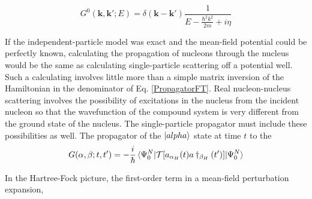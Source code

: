 \begin{equation} \label{PropagatorKSpace}
    G^{0}(\bm{k}, \bm{k'}; E) = \delta(\bm{k}-\bm{k'})\frac{1}{E-\frac{\hbar^{2}k^{2}}{2m} + i\eta}
\end{equation}

\noindent
If the independent-particle model was exact and the mean-field potential could be perfectly known,
calculating the propagation of nucleons through the nucleus would be the same as calculating
single-particle scattering off a potential well. Such a calculating involves little more than
a simple matrix inversion of the Hamiltonian in the denominator of Eq. \ref{PropagatorFT}.
Real nucleon-nucleus scattering involves the possibility of excitations in the nucleus from the incident
nucleon so that the wavefunction of the compound system is very different from the ground state of
the nucleus. The single-particle propagator must include these possibilities as well.
The propagator of the $\ket{alpha}$ state at time $t$ to the 
\begin{equation}
    G(\alpha, \beta; t, t') =
    -\frac{i}{\hbar}\braket{\Psi^{N}_{0}|\mathcal{T}[a_{\alpha_{H}}(t)a\dagger_{\beta_{H}}(t')]|\Psi^{N}_{0}}
\end{equation}

\noindent

In the Hartree-Fock picture, the first-order term in a mean-field perturbation expansion,


